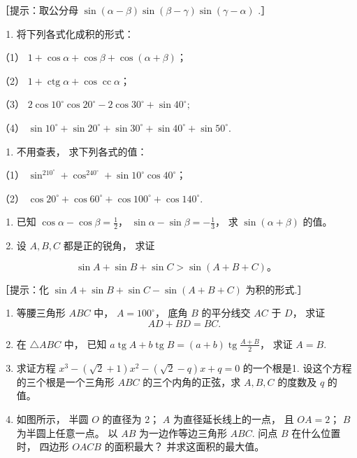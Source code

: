 ［提示：取公分母
\(\sin (\alpha -\beta)\sin (\beta -\gamma)\sin (\gamma -\alpha)\) .］

\begin{enumerate}[start=37]
\item
  将下列各式化成积的形式：
\end{enumerate}

（1） \(1 + \cos \alpha + \cos \beta + \cos (\alpha + \beta)\)；

（2）
\(1 + \operatorname{ctg} \alpha + \cos \operatorname{cc} \alpha\)；

（3）
\(2\cos 10^{\circ}\cos 20^{\circ} - 2\cos 30^{\circ} + \sin 40^{\circ};\)

（4）
\(\sin 10^{\circ} + \sin 20^{\circ} + \sin 30^{\circ} + \sin 40^{\circ} + \sin 50^{\circ}\).

\begin{enumerate}[start=38]
\item
  不用查表， 求下列各式的值：
\end{enumerate}

（1）
\(\sin^210^\circ + \cos^240^\circ + \sin 10^\circ \cos 40^\circ\)；

（2）
\(\cos 20^{\circ} + \cos 60^{\circ} + \cos 100^{\circ} + \cos 140^{\circ}\).

\begin{enumerate}[start=39]
\item
  已知 \(\cos \alpha - \cos \beta = \frac{1}{2}\)，
  \(\sin \alpha - \sin \beta = -\frac{1}{3}\)， 求
  \(\sin (\alpha + \beta)\) 的值。
\item
  设 \(A, B, C\) 都是正的锐角， 求证
\end{enumerate}

\[
\sin A + \sin B + \sin C > \sin (A + B + C)\text{。}
\]

［提示：化 \(\sin A + \sin B + \sin C - \sin (A + B + C)\) 为积的形式.］

\begin{enumerate}[start=41]
\item
  等腰三角形 \(ABC\) 中， \(A = 100^{\circ}\)， 底角 \(B\) 的平分线交
  \(AC\) 于 \(D\)， 求证
\[
A D + B D = B C.
\]
\item
  在 \(\triangle ABC\) 中， 已知
  \(a \operatorname{tg} A + b \operatorname{tg} B = (a + b) \operatorname{tg} \frac{A + B}{2}\)，
  求证 \(A = B\).
\item
  求证方程 \(x^{3} - (\sqrt{2} + 1)x^{2} - (\sqrt{2} - q)x + q = 0\)
  的一个根是1. 设这个方程的三个根是一个三角形 \(ABC\)
  的三个内角的正弦，求 \(A, B, C\) 的度数及 \(q\) 的值。
\item
  如图所示， 半圆 \(O\) 的直径为 2； \(A\) 为直径延长线上的一点， 且
  \(OA = 2\)； \(B\) 为半圆上任意一点。 以 \(AB\) 为一边作等边三角形
  \(ABC\). 问点 \(B\) 在什么位置时， 四边形 \(OACB\) 的面积最大？
  并求这面积的最大值。
\end{enumerate}

